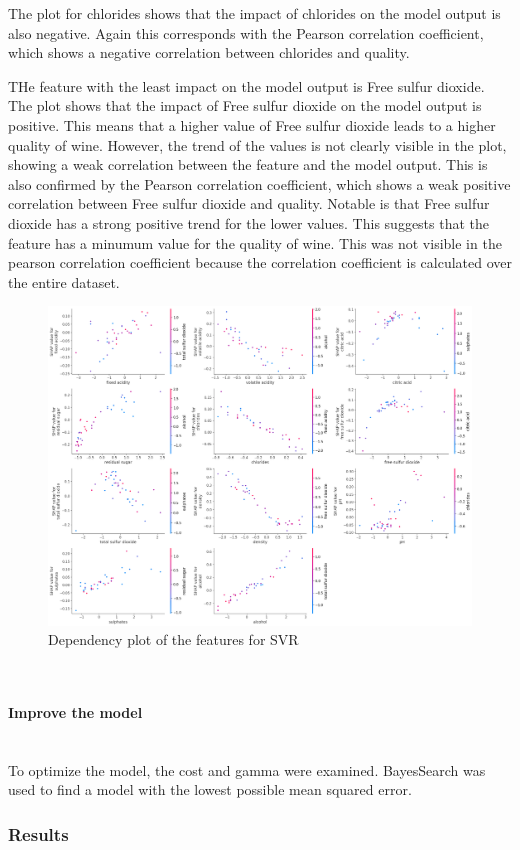 \documentclass{article}
\newcommand{\subsubsubsection}[1]{%
  \paragraph{#1}\mbox{}\\}
\begin{document}
The plot for chlorides shows that the impact of chlorides on the model output is also negative. Again this corresponds with the Pearson correlation coefficient, which shows a negative correlation between chlorides and quality.

THe feature with the least impact on the model output is Free sulfur dioxide.
The plot shows that the impact of Free sulfur dioxide on the model output is positive.
This means that a higher value of Free sulfur dioxide leads to a higher quality of wine.
However, the trend of the values is not clearly visible in the plot, showing a weak correlation between the feature and the model output.
This is also confirmed by the Pearson correlation coefficient, which shows a weak positive correlation between Free sulfur dioxide and quality.
Notable is that Free sulfur dioxide has a strong positive trend for the lower values. This suggests that the feature has a minumum value for the quality of wine.
This was not visible in the pearson correlation coefficient because the correlation coefficient is calculated over the entire dataset.

\begin{figure}
    \centering
    \includegraphics[width=\linewidth]{figures/shap-dependency-svr.png}
    \caption{Dependency plot of the features for SVR}
    \label{fig:dependency-plot-svr}
\end{figure}
\subsubsubsection{Improve the model}
To optimize the model, the cost and gamma were examined. BayesSearch was used to find a model with the lowest possible mean squared error. 

\subsubsection{Results}
\end{document}

